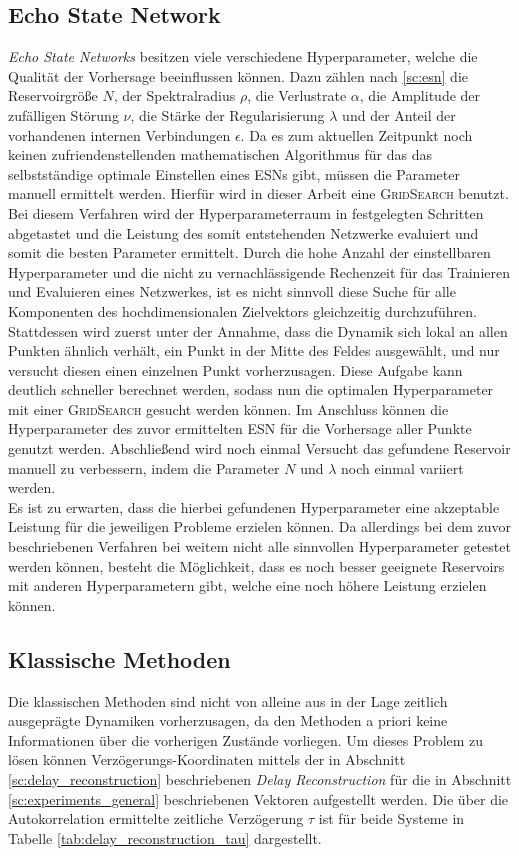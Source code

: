 \subsection{Echo State Network}
\label{sec:exp_general_esn}
\textit{Echo State Networks} besitzen viele verschiedene Hyperparameter, welche die Qualität der Vorhersage beeinflussen können. Dazu zählen nach \ref{sc:esn} die Reservoirgröße $N$, der Spektralradius $\rho$, die Verlustrate $\alpha$, die Amplitude der zufälligen Störung $\nu$, die Stärke der Regularisierung $\lambda$ und der Anteil der vorhandenen internen Verbindungen $\epsilon$. Da es zum aktuellen Zeitpunkt noch keinen zufriendenstellenden mathematischen Algorithmus für das das selbstständige optimale Einstellen eines \textsc{ESN}s gibt, müssen die Parameter manuell ermittelt werden. Hierfür wird in dieser Arbeit eine \textsc{GridSearch} benutzt. Bei diesem Verfahren wird der Hyperparameterraum in festgelegten Schritten abgetastet und die Leistung des somit entstehenden Netzwerke evaluiert und somit die besten Parameter ermittelt. Durch die hohe Anzahl der einstellbaren Hyperparameter und die nicht zu vernachlässigende Rechenzeit für das Trainieren und Evaluieren eines Netzwerkes, ist es nicht sinnvoll diese Suche für alle Komponenten des hochdimensionalen Zielvektors gleichzeitig durchzuführen. Stattdessen wird zuerst unter der Annahme, dass die Dynamik sich lokal an allen Punkten ähnlich verhält, ein Punkt in der Mitte des Feldes ausgewählt, und nur versucht diesen einen einzelnen Punkt vorherzusagen. Diese Aufgabe kann deutlich schneller berechnet werden, sodass nun die optimalen Hyperparameter mit einer \textsc{GridSearch} gesucht werden können. Im Anschluss können die Hyperparameter des  zuvor ermittelten \textsc{ESN} für die Vorhersage aller Punkte genutzt werden. Abschließend wird noch einmal Versucht das gefundene Reservoir manuell zu verbessern, indem die Parameter $N$ und $\lambda$ noch einmal variiert werden.\\
Es ist zu erwarten, dass die hierbei gefundenen Hyperparameter eine akzeptable Leistung für die jeweiligen Probleme erzielen können. Da allerdings bei dem zuvor beschriebenen Verfahren bei weitem nicht alle sinnvollen Hyperparameter getestet werden können, besteht die Möglichkeit, dass es noch besser geeignete Reservoirs mit anderen Hyperparametern gibt, welche eine noch höhere Leistung erzielen können.

\FloatBarrier
\subsection{Klassische Methoden}
Die klassischen Methoden sind nicht von alleine aus in der Lage zeitlich ausgeprägte Dynamiken vorherzusagen, da den Methoden a priori keine Informationen über die vorherigen Zustände vorliegen. Um dieses Problem zu lösen können Verzögerungs-Koordinaten mittels der in Abschnitt \ref{sc:delay_reconstruction} beschriebenen \textit{Delay Reconstruction} für die in Abschnitt \ref{sc:experiments_general} beschriebenen Vektoren aufgestellt werden. Die über die Autokorrelation ermittelte zeitliche Verzögerung $\tau$ ist für beide Systeme in Tabelle \ref{tab:delay_reconstruction_tau} dargestellt.     

